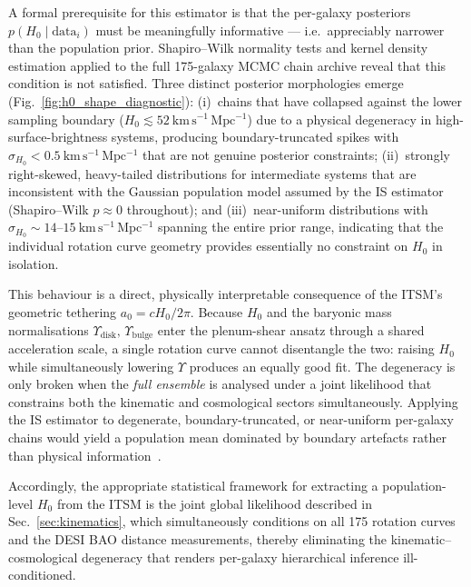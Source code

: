 \documentclass[aps,prd,10pt,twocolumn,superscriptaddress,nofootinbib,floatfix]{revtex4-2}
\begin{document}
A formal prerequisite for this estimator is that the per-galaxy posteriors $p(H_0 \mid \mathrm{data}_i)$ must be meaningfully informative --- i.e.\ appreciably narrower than the population prior. Shapiro--Wilk normality tests and kernel density estimation applied to the full 175-galaxy MCMC chain archive reveal that this condition is not satisfied. Three distinct posterior morphologies emerge (Fig.~\ref{fig:h0_shape_diagnostic}): (i)~chains that have collapsed against the lower sampling boundary ($H_0 \lesssim 52\ \mathrm{km\,s^{-1}\,Mpc^{-1}}$) due to a physical degeneracy in high-surface-brightness systems, producing boundary-truncated spikes with $\sigma_{H_0} < 0.5\ \mathrm{km\,s^{-1}\,Mpc^{-1}}$ that are not genuine posterior constraints; (ii)~strongly right-skewed, heavy-tailed distributions for intermediate systems that are inconsistent with the Gaussian population model assumed by the IS estimator (Shapiro--Wilk $p \approx 0$ throughout); and (iii)~near-uniform distributions with $\sigma_{H_0} \sim 14$--$15\ \mathrm{km\,s^{-1}\,Mpc^{-1}}$ spanning the entire prior range, indicating that the individual rotation curve geometry provides essentially no constraint on $H_0$ in isolation.

This behaviour is a direct, physically interpretable consequence of the ITSM's geometric tethering $a_0 = cH_0/2\pi$. Because $H_0$ and the baryonic mass normalisations $\Upsilon_{\mathrm{disk}},\,\Upsilon_{\mathrm{bulge}}$ enter the plenum-shear ansatz through a shared acceleration scale, a single rotation curve cannot disentangle the two: raising $H_0$ while simultaneously lowering $\Upsilon$ produces an equally good fit. The degeneracy is only broken when the \emph{full ensemble} is analysed under a joint likelihood that constrains both the kinematic and cosmological sectors simultaneously. Applying the IS estimator to degenerate, boundary-truncated, or near-uniform per-galaxy chains would yield a population mean dominated by boundary artefacts rather than physical information~\cite{thrane2019,hogg2010}.

Accordingly, the appropriate statistical framework for extracting a population-level $H_0$ from the ITSM is the joint global likelihood described in Sec.~\ref{sec:kinematics}, which simultaneously conditions on all 175 rotation curves and the DESI BAO distance measurements, thereby eliminating the kinematic--cosmological degeneracy that renders per-galaxy hierarchical inference ill-conditioned.
\end{document}
